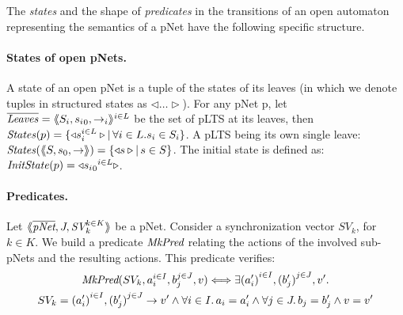 \documentclass[smallcondensed]{svjour3}
\newcommand{\TODO}[1]{\textcolor{red}{\textbf{[TODO:#1]}}}
\newcommand{\MkPred}{\symb{MkPred}}
\begin{document}
%

The \emph{states} and the shape of \emph{predicates} in the
transitions
of an open automaton representing the semantics of a pNet
have the following specific structure.

\paragraph{States of open pNets.}\label{def-states}
  A state of an open pNet is a tuple of the
  states of its leaves (in which we denote tuples
  in structured states as $\triangleleft\ldots\triangleright$).
  For any pNet p, let $\overline{\mathit{Leaves}} = \langle\hspace{-0.58ex}\langle S_i,{s_i}_0, \to_i\rangle\hspace{-0.58ex}\rangle^{i \in L}$ be the set of pLTS at its leaves,
  then $\mathit{States}(p) = \{\triangleleft{s_i^{i\in L}}\triangleright
  |\, \forall i\in L. s_i \in S_i\}$.
A pLTS being its own single leave:
  $\mathit{States}(\langle\hspace{-0.58ex}\langle S,s_0, \to\rangle\hspace{-0.58ex}\rangle) = \{\triangleleft{s}\triangleright|\, s \in S\}$.
The initial state is defined as:
$\mathit{InitState}(p) = \triangleleft{{{s_i}_0}^{i\in L}}\triangleright$.



\paragraph{Predicates.}
Let
$\mylangle\overline{\pNet},J,\symb{SV}_k^{k\in K} \myrangle$
be a pNet. Consider a synchronization vector $SV_k$, for $k\in K$. We build a
predicate $\MkPred$ relating
the actions of the involved sub-pNets and the resulting actions. This predicate verifies:
\begin{multline*}
  \MkPred(SV_k, a_i^{i\in I}, b_j^{j\in J}, v)\Longleftrightarrow
  \exists {(a'_i)}^{i\in I},
          {(b'_j)}^{j\in J},v'.\\
          SV_k={(a'_i)}^{i\in I}, {(b'_j)}^{j\in J}\rightarrow v'
          \land
          \forall i\in I.\, a_i=a'_i\land \forall j \in J.\, b_j=b'_j \land v=v'
\end{multline*}
\end{document}
